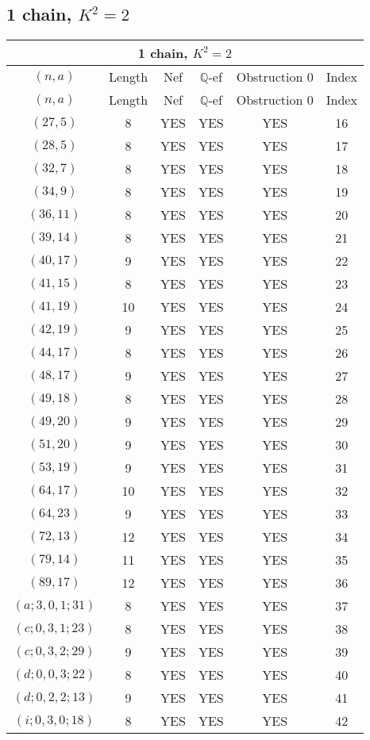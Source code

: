 \subsection{1 chain, $K^2 = 2$}
\begin{longtable}{|c|c|c|c|c|c|}
\hline
\multicolumn{6}{|c|}{1 chain, $K^2 = 2$}\\
\hline
$(n,a)$ & Length & Nef & $\mathbb Q$-ef & Obstruction 0 & Index\\
\hline
\endfirsthead

\hline
$(n,a)$ & Length & Nef & $\mathbb Q$-ef & Obstruction 0 & Index\\
\hline
\endhead
\hline
\endfoot

$(27, 5)$ & 8 & YES & YES & YES & 16\\
$(28, 5)$ & 8 & YES & YES & YES & 17\\
$(32, 7)$ & 8 & YES & YES & YES & 18\\
$(34, 9)$ & 8 & YES & YES & YES & 19\\
$(36, 11)$ & 8 & YES & YES & YES & 20\\
$(39, 14)$ & 8 & YES & YES & YES & 21\\
$(40, 17)$ & 9 & YES & YES & YES & 22\\
$(41, 15)$ & 8 & YES & YES & YES & 23\\
$(41, 19)$ & 10 & YES & YES & YES & 24\\
$(42, 19)$ & 9 & YES & YES & YES & 25\\
$(44, 17)$ & 8 & YES & YES & YES & 26\\
$(48, 17)$ & 9 & YES & YES & YES & 27\\
$(49, 18)$ & 8 & YES & YES & YES & 28\\
$(49, 20)$ & 9 & YES & YES & YES & 29\\
$(51, 20)$ & 9 & YES & YES & YES & 30\\
$(53, 19)$ & 9 & YES & YES & YES & 31\\
$(64, 17)$ & 10 & YES & YES & YES & 32\\
$(64, 23)$ & 9 & YES & YES & YES & 33\\
$(72, 13)$ & 12 & YES & YES & YES & 34\\
$(79, 14)$ & 11 & YES & YES & YES & 35\\
$(89, 17)$ & 12 & YES & YES & YES & 36\\
$(a; 3, 0, 1; 31)$ & 8 & YES & YES & YES & 37\\
$(c; 0, 3, 1; 23)$ & 8 & YES & YES & YES & 38\\
$(c; 0, 3, 2; 29)$ & 9 & YES & YES & YES & 39\\
$(d; 0, 0, 3; 22)$ & 8 & YES & YES & YES & 40\\
$(d; 0, 2, 2; 13)$ & 9 & YES & YES & YES & 41\\
$(i; 0, 3, 0; 18)$ & 8 & YES & YES & YES & 42
\end{longtable}
